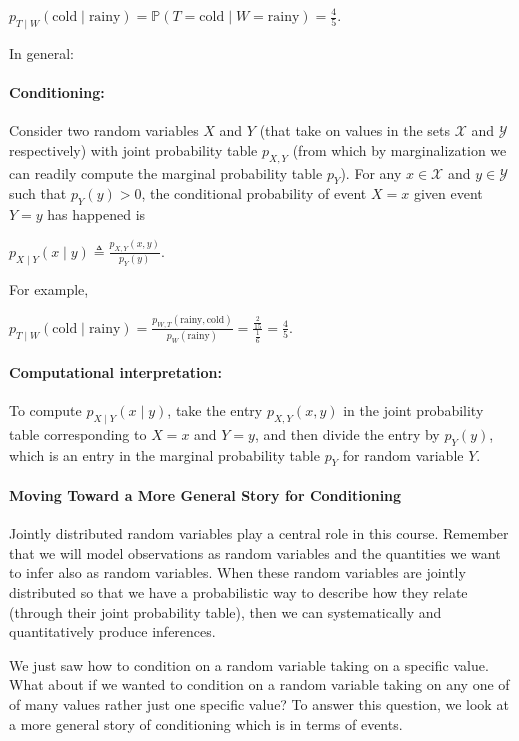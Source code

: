 \documentclass[6008notes.tex]{subfiles}
\begin{document}
$p_{T\mid W}(\text {cold}\mid \text {rainy})=\mathbb {P}(T=\text {cold}\mid W=\text {rainy})=\frac{4}{5}.$
 
In general:

\paragraph{Conditioning:} Consider two random variables $X$ and $Y$ (that take on values in the sets $\mathcal{X}$ and $\mathcal{Y}$ respectively) with joint probability table $p_{X,Y}$ (from which by marginalization we can readily compute the marginal probability table $p_Y$). For any $x\in \mathcal{X}$ and $y\in \mathcal{Y}$ such that $p_{Y}(y)>0$, the conditional probability of event $X=x$ given event $Y=y$ has happened is

$p_{X\mid Y}(x\mid y)\triangleq \frac{p_{X,Y}(x,y)}{p_{Y}(y)}.$
 
For example,

$p_{T\mid W}(\text {cold}\mid \text {rainy})=\frac{p_{W,T}(\text {rainy},\text {cold})}{p_{W}(\text {rainy})}=\frac{\frac{2}{15}}{\frac{1}{6}}=\frac{4}{5}.$
 
\paragraph{Computational interpretation:} To compute $p_{X\mid Y}(x\mid y)$, take the entry $p_{X,Y}(x,y)$ in the joint probability table corresponding to $X=x$ and $Y=y$, and then divide the entry by $p_Y(y)$, which is an entry in the marginal probability table $p_Y$ for random variable $Y$.

\paragraph{Moving Toward a More General Story for Conditioning}

Jointly distributed random variables play a central role in this course. Remember that we will model observations as random variables and the quantities we want to infer also as random variables. When these random variables are jointly distributed so that we have a probabilistic way to describe how they relate (through their joint probability table), then we can systematically and quantitatively produce inferences.

We just saw how to condition on a random variable taking on a specific value. What about if we wanted to condition on a random variable taking on any one of of many values rather just one specific value? To answer this question, we look at a more general story of conditioning which is in terms of events.
\end{document}
